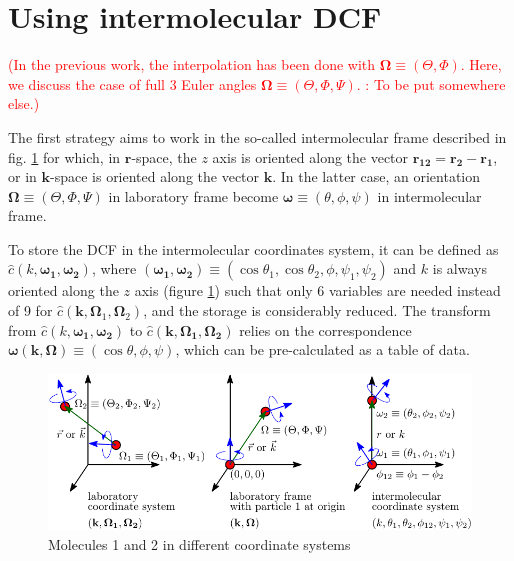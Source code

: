 \section{Using intermolecular DCF}

\textcolor{red}{(In the previous work, the interpolation has been
done with $\mathbf{\Omega}\equiv(\Theta,\Phi)$. Here, we discuss
the case of full 3 Euler angles $\mathbf{\Omega}\equiv(\Theta,\Phi,\Psi)$.
: To be put somewhere else.)}

The first strategy aims to work in the so-called intermolecular frame
described in fig. \ref{fig:coordinate_systems} for which, in $\mathbf{r}$-space,
the $z$ axis is oriented along the vector $\mathbf{r_{12}}=\mathbf{r_{2}}-\mathbf{r_{1}}$,
or in $\mathbf{k}$-space is oriented along the vector $\mathbf{k}$.
In the latter case, an orientation $\mathbf{\Omega}\equiv(\Theta,\Phi,\Psi)$
in laboratory frame become $\boldsymbol{\omega}\equiv(\theta,\phi,\psi)$
in intermolecular frame. 

To store the DCF in the intermolecular coordinates system, it can
be defined as $\hat{c}(k,\boldsymbol{\omega_{1}},\boldsymbol{\omega_{2}})$,
where $(\boldsymbol{\omega_{1}},\boldsymbol{\omega_{2}})\equiv(\cos\theta_{1},\cos\theta_{2},\phi,\psi_{1},\psi_{2})$
and $k$ is always oriented along the $z$ axis (figure \ref{fig:coordinate_systems})
such that only 6 variables are needed instead of 9 for $\hat{c}(\mathbf{k},\mathbf{\Omega}_{1},\mathbf{\Omega}_{2})$,
and the storage is considerably reduced. The transform from $\hat{c}(k,\boldsymbol{\omega_{1}},\boldsymbol{\omega_{2}})$
to $\hat{c}(\mathbf{k},\mathbf{\Omega_{1}},\mathbf{\Omega_{2}})$
relies on the correspondence $\boldsymbol{\omega}(\mathbf{k},\mathbf{\Omega})\equiv(\cos\theta,\phi,\psi)$,
which can be pre-calculated as a table of data.

%
\begin{figure}[h]
\begin{centering}
\includegraphics{_figure/coordinate_system}
\par\end{centering}

\caption{%
Molecules 1 and 2 in different coordinate systems\foreignlanguage{english}{\label{fig:coordinate_systems}}%
}
\end{figure}



